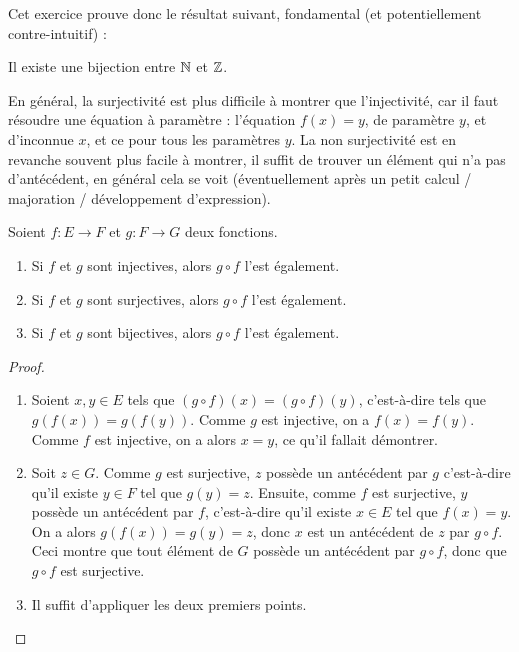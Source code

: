 Cet exercice prouve donc le résultat suivant, fondamental (et potentiellement contre-intuitif) :

\begin{mdframed}[linewidth=2]
Il existe une bijection entre $\mathbb{N}$ et $\mathbb{Z}$.
\end{mdframed}


\begin{remarque}
En général, la surjectivité est plus difficile à montrer que l'injectivité, car il faut résoudre une équation à paramètre : l'équation $f(x)=y$, de paramètre $y$, et d'inconnue $x$, et ce pour tous les paramètres $y$. La non surjectivité est en revanche souvent plus facile à montrer, il suffit de trouver un élément qui n'a pas d'antécédent, en général cela se voit (éventuellement après un petit calcul / majoration / développement d'expression).
\end{remarque}


\begin{proposition}\label{prop-composition-inj-surj-bij}
Soient $f : E\to F$ et $g : F\to G$ deux fonctions.
\begin{enumerate}
\item Si $f$ et $g$ sont injectives, alors $g\circ f$ l'est également.
\item Si $f$ et $g$ sont surjectives, alors $g\circ f$ l'est également.
\item Si $f$ et $g$ sont bijectives, alors $g\circ f$ l'est également.
\end{enumerate}
\end{proposition}
\begin{proof}
\begin{enumerate}
\item Soient $x, y \in E$ tels que $(g\circ f)(x) = (g\circ f)(y) $, c'est-à-dire tels que $g(f(x))=g(f(y))$. Comme $g$ est injective, on a $f(x)=f(y)$. Comme $f$ est injective, on a alors $x=y$, ce qu'il fallait démontrer.
\item Soit $z\in G$. Comme $g$ est surjective, $z$ possède un antécédent par $g$ c'est-à-dire qu'il existe $y\in F$ tel que $g(y)=z$. Ensuite, comme $f$ est surjective, $y$ possède un antécédent par $f$, c'est-à-dire qu'il existe $x\in E$ tel que $f(x)=y$. On a alors $g(f(x)) = g(y)=z$, donc $x$ est un antécédent de $z$ par $g\circ f$. Ceci montre que tout élément de $G$ possède un antécédent par $g\circ f$, donc que $g\circ f$ est surjective.
\item Il suffit d'appliquer les deux premiers points.
\end{enumerate}
\end{proof}



